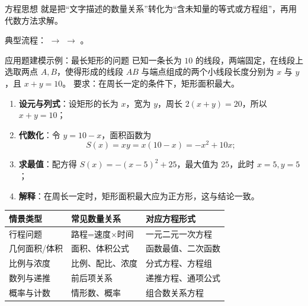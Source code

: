 \documentclass[a4paper,11pt]{ctexart}
\begin{document}
\begin{definitionbox}{方程思想}
就是把“文字描述的数量关系”转化为“含未知量的等式或方程组”，再用代数方法求解。
\par
典型流程： $\rightarrow$  $\rightarrow$ 。
\end{definitionbox}

\begin{roadmap}
\end{roadmap}

\begin{examplebox}{应用题建模示例：最长矩形的问题}
已知一条长为 $10$ 的线段，两端固定，在线段上选取两点 $A,B$，使得形成的线段 $AB$ 与端点组成的两个小线段长度分别为 $x$ 与 $y$，且 $x+y=10$。
要求：在周长一定的条件下，矩形面积最大。

\begin{enumerate}
  \item \textbf{设元与列式}：设矩形的长为 $x$，宽为 $y$，周长 $2(x+y)=20$，所以 $x+y=10$；
  \item \textbf{代数化}：令 $y=10-x$，面积函数为
  \[
  S(x)=xy=x(10-x)=-x^2+10x;
  \]
  \item \textbf{求最值}：配方得 $S(x)=-(x-5)^2+25$，最大值为 $25$，此时 $x=5,y=5$；
  \item \textbf{解释}：在周长一定时，矩形面积最大应为正方形，这与结论一致。
\end{enumerate}
\end{examplebox}

\begin{center}

\vspace{0.5em}
\begin{tabular}{p{} p{} p{}}
\hline
\textbf{情景类型} & \textbf{常见数量关系} & \textbf{对应方程形式} \\
\hline
行程问题 & 路程=速度$\times$时间 & 一元二元一次方程 \\
几何面积/体积 & 面积、体积公式 & 函数最值、二次函数 \\
比例与浓度 & 比例、配比、浓度 & 分式方程、方程组 \\
数列与递推 & 前后项关系 & 递推方程、通项公式 \\
概率与计数 & 情形数、概率 & 组合数关系方程 \\
\hline
\end{tabular}
\end{center}
\end{document}
